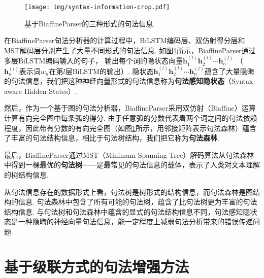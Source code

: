 \begin{figure}[hb]
    \centering
    \texttt{[image: img/syntax-information-crop.pdf]}
    \caption{基于BiaffineParser的三种形式的句法信息. }
    \label{fig:syntax-information}
\end{figure}

在BiaffineParser句法分析器的计算过程中，BiLSTM编码层、双仿射得分层和MST解码层分别产生了大量不同形式的句法信息.
如图\ref{fig:syntax-information}所示，BiaffineParser通过多层BiLSTM编码输入的句子，
输出每个词的隐状态向量$\mathbf{h}_1^{(l)}\mathbf{h}_2^{(l)}\cdots \mathbf{h}_n^{(l)}$ （ $\mathbf{h}_n^{(l)}$表示词$w_n$在第$l$层BiLSTM的输出）.  隐状态$\mathbf{h}_1^{(l)}\mathbf{h}_2^{(l)} \cdots \mathbf{h}_n^{(l)}$蕴含了大量隐晦的句法信息，我们把这种神经向量形式的句法信息称为\textbf{句法感知隐状态}（Syntax-aware Hidden States）.

然后，作为一个基于图的句法分析器，BiaffineParser采用双仿射（Biaffine）运算计算有向完全图中每条弧的得分. 由于任意弧的分数代表着两个词之间的句法依赖程度，因此带有分数的有向完全图（如图\ref{fig:syntax-information}所示，用邻接矩阵表示句法森林）蕴含了丰富的句法结构信息，相比于句法树结构，我们把它称为\textbf{句法森林}.

最后，BiaffineParser通过MST（Minimum Spanning Tree）解码算法从句法森林中得到一棵最优的\textbf{句法树}——是最常见的句法信息的载体，表示了人类对文本理解的树结构信息.

从句法信息存在的数据形式上看，句法树是树形式的结构信息，而句法森林是图结构的信息.
句法森林中包含了所有可能的句法树，蕴含了比句法树更为丰富的句法结构信息.
与句法树和句法森林中蕴含的显式的句法结构信息不同，句法感知隐状态是一种隐晦的神经向量句法信息，能一定程度上减弱句法分析带来的错误传递问题.


\section{基于级联方式的句法增强方法}
\label{sec:orl_pipeline}

